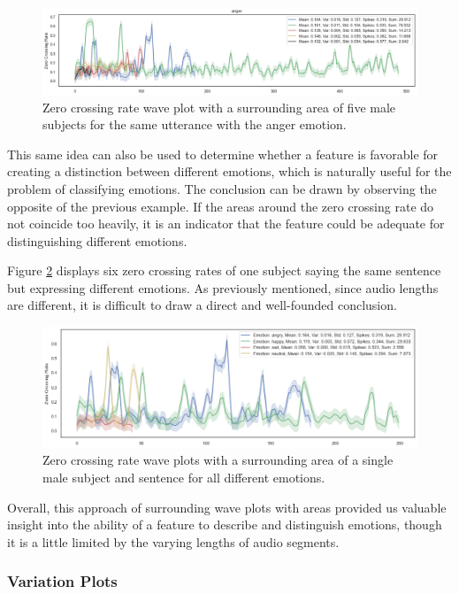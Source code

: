 \begin{figure}[H]
	\centering
	\includegraphics[width=1\linewidth]{figs/4_1_traditional/zcrAreaOnly1.png}
	\caption{Zero crossing rate wave plot with a surrounding area of five male subjects for the same utterance with the anger emotion.}
	\label{fig:zcrAreaOnly1}
\end{figure}

This same idea can also be used to determine whether a feature is favorable for creating a distinction between different emotions, which is naturally useful for the problem of classifying emotions. The conclusion can be drawn by observing the opposite of the previous example. If the areas around the zero crossing rate do not coincide too heavily, it is an indicator that the feature could be adequate for distinguishing different emotions.

Figure \ref{fig:zcrAreaSameSubj} displays six zero crossing rates of one subject saying the same sentence but expressing different emotions. As previously mentioned, since audio lengths are different, it is difficult to draw a direct and well-founded conclusion.

\begin{figure}[H]
	\centering
	\includegraphics[width=.8\linewidth]{figs/4_1_traditional/zcr_male_same_subject.png}
	\caption{Zero crossing rate wave plots with a surrounding area of a single male subject and sentence for all different emotions.}
	\label{fig:zcrAreaSameSubj}
\end{figure}

Overall, this approach of surrounding wave plots with areas provided us valuable insight into the ability of a feature to describe and distinguish emotions, though it is a little limited by the varying lengths of audio segments.

\subsubsection{Variation Plots}


